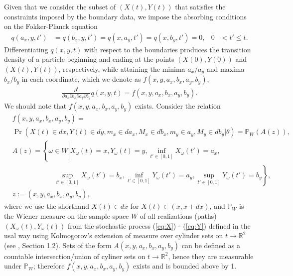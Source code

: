 Given that we consider the subset of $(X(t), Y(t))$ that satisfies the constraints imposed by the boundary data, we impose the absorbing conditions on the Fokker-Planck equation
\begin{align}
  q(a_x, y,t') &= q(b_x,y,t') = q(x,a_y,t') = q(x,b_y,t') = 0, & 0 &< t' \leq t. \label{eq:2}
\end{align}
Differentiating $q(x,y,t)$ with respect to the boundaries produces the
transition density of a particle beginning and ending at the points
$(X(0), Y(0))$ and $(X(t), Y(t))$, respectively, while attaining the
minima $a_x/a_y$ and maxima $b_x/b_y$ in each coordinate, which we
denote as $f(x,y,a_x,b_x,a_y,b_y)$,
\begin{align}
  \frac{\partial^4}{\partial a_x \partial b_x \partial a_y \partial b_y} q(x,y,t) = f(x,y,a_x,b_x,a_y,b_y).
  \label{eq:pdf}
\end{align}
We should note that $f(x,y,a_x,b_x,a_y,b_y)$ exists. Consider the relation
\begin{align*}
  &f(x,y,a_x,b_x,a_y,b_y) = \\
  &\Pr\left(X(t) \in dx, Y(t) \in dy, m_x \in da_x, M_x \in db_x, m_y
    \in a_y, M_y \in db_y \left| \theta \right.\right) = \mathbb{P}_{W}\left( A(z) \right), \\
   & A(z) = \left\{ \omega \in W \left| X_\omega(t) = x,
     Y_\omega(t)=y, \inf_{t'\in [0,1]} X_\omega(t') = a_x, \right.  \right. \\
   &\qquad \qquad \qquad \left. \sup_{t'\in [0,1]} X_\omega(t') = b_x, \inf_{t'\in [0,1]}
         Y_\omega(t') = a_y, \sup_{t'\in [0,1]} Y_\omega(t') = b_y
     \right\}, \\
  &z := (x,y,a_x,b_x,a_y,b_y),
\end{align*}
where we use the shorthand $X(t) \in dx$ for $X(t) \in (x, x+dx)$, and
$\mathbb{P}_{W}$ is the Wiener measure on the sample space $W$ of all
realizations (paths) $(X_\omega(t), Y_\omega(t))$ from the stochastic
process (\ref{eq:X}) - (\ref{eq:Y}) defined in the usal way using
Kolmogorov's extension of measure over cylinder sets on
$t \to \mathbb{R}^2$ (see \cite{freidlin1985functional}, Section
1.2). Sets of the form $A(x,y,a_x,b_x,a_y,b_y)$ can be defined as a
countable intersection/union of cyliner sets on $t \to \mathbb{R}^2$,
hence they are measurable under $\mathbb{P}_{W}$; therefore $f(x,y,a_x,b_x,a_y,b_y)$
exists and is bounded above by 1.

